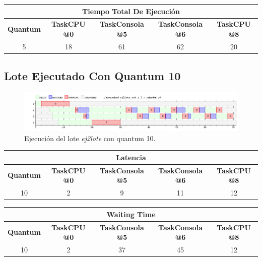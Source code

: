 \begin{center}
	\begin{tabular}{|c|c|c|c|c|}
		\hline
		\multicolumn{5}{|c|}{\textbf{Tiempo Total De Ejecución}} \\
		\hline
		\textbf{Quantum} & \textbf{TaskCPU @0} & \textbf{TaskConsola @5} & \textbf{TaskConsola @6} & \textbf{TaskCPU @8} \\
		\hline
		5 & 18 & 61 & 62 & 20 \\
		\hline
	\end{tabular}
\end{center}

\subsection{Lote Ejecutado Con Quantum 10}

\begin{figure}[!h]
	\begin{center}
		\includegraphics[width=500px]{imagenes/ej5_10.png}
		\caption{Ejecución del lote \emph{ej2lote} con quantum 10.}
		\label{fig:grafico_ej5_10}
	\end{center}
\end{figure}

\begin{center}
	\begin{tabular}{|c|c|c|c|c|}
		\hline
		\multicolumn{5}{|c|}{\textbf{Latencia}} \\
		\hline
		\textbf{Quantum} & \textbf{TaskCPU @0} & \textbf{TaskConsola @5} & \textbf{TaskConsola @6} & \textbf{TaskCPU @8} \\
		\hline
		10 & 2 & 9 & 11 & 12 \\
		\hline
	\end{tabular}
\end{center}

\begin{center}
	\begin{tabular}{|c|c|c|c|c|}
		\hline
		\multicolumn{5}{|c|}{\textbf{Waiting Time}} \\
		\hline
		\textbf{Quantum} & \textbf{TaskCPU @0} & \textbf{TaskConsola @5} & \textbf{TaskConsola @6} & \textbf{TaskCPU @8} \\
		\hline
		10 & 2 & 37 & 45 & 12 \\
		\hline
	\end{tabular}
\end{center}

